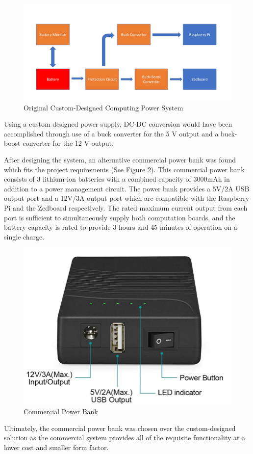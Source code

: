 \begin{figure}[H]
\centering
\includegraphics[width=15cm]{img/Power_Diagram.png}
\caption{Original Custom-Designed Computing Power System}
\label{powerdiag}
\end{figure}

Using a custom designed power supply, DC-DC conversion would have been accomplished through use of a buck converter for the 5 V output and a buck-boost converter for the 12 V output.

After designing the system, an alternative commercial power bank was found which fits the project requirements (See Figure \ref{powerbank}). This commercial power bank consists of 3 lithium-ion batteries with a combined capacity of 3000mAh in addition to a power management circuit. The power bank provides a 5V/2A USB output port and a 12V/3A output port which are compatible with the Raspberry Pi and the Zedboard respectively. The rated maximum current output from each port is sufficient to simultaneously supply both computation boards, and the battery capacity is rated to provide 3 hours and 45 minutes of operation on a single charge.

\begin{figure}[H]
\centering
\includegraphics[width=12cm]{img/power_bank.png}
\caption{Commercial Power Bank}
\label{powerbank}
\end{figure}

Ultimately, the commercial power bank was chosen over the custom-designed solution as the commercial system provides all of the requisite functionality at a lower cost and smaller form factor.
